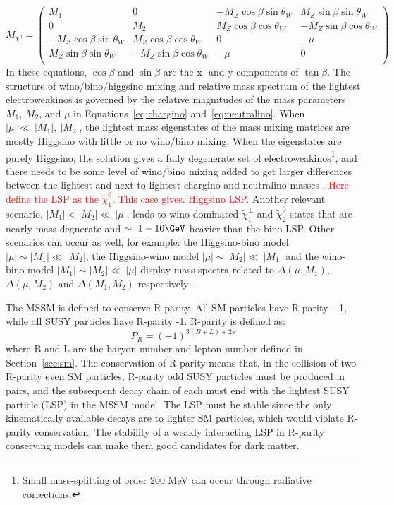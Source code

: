 \begin{equation}
M_{\chi^0}=
\begin{pmatrix}
M_1 & 0 & -M_Z\cos\beta \sin\theta_W & M_Z\sin\beta \sin\theta_W\\
0 & M_2 & M_Z\cos\beta \cos\theta_W & -M_Z\sin\beta \cos\theta_W\\
-M_Z\cos\beta \sin\theta_W & M_Z\cos\beta \cos\theta_W & 0 & -\mu \\
M_Z\sin\beta \sin\theta_W & -M_Z\sin\beta \cos\theta_W & -\mu & 0 \\
\end{pmatrix}
\label{eq:neutralino}
\end{equation}
In these equations, $\cos\beta$ and $\sin\beta$ are the x- and y-components of $\tan\beta$.  The structure of wino/bino/higgsino mixing and relative mass spectrum of the lightest electroweakinos is governed by the relative magnitudes of the mass parameters $M_1$, $M_2$, and $\mu$ in Equations~\ref{eq:chargino} and~\ref{eq:neutralino}.  When $|\mu|\ll~|M_1|,~|M_2|$, the lightest mass eigenstates of the mass mixing matrices are mostly Higgsino with little or no wino/bino mixing.  When the eigenstates are purely Higgsino, the solution gives a fully degenerate set of electroweakinos\footnote{Small mass-splitting of order 200 MeV can occur through radiative corrections.}, and there needs to be some level of wino/bino mixing added to get larger differences between the lightest and next-to-lightest chargino and neutralino masses \cite{PhysRevD.93.063525}.  \textcolor{red}{Here define the LSP as the $\tilde\chi_1^0$.  This case gives. Higgsino LSP.}  Another relevant scenario, $|M_1| <|M_2|\ll~|\mu|$, leads to wino dominated $\tilde\chi_1^\pm$ and $\tilde\chi_2^0$ states that are nearly mass degnerate and $\sim~1-10\GeV$ heavier than the bino LSP. Other scenarios can occur as well, for example: the Higgsino-bino model $|\mu|\sim |M_1|\ll~|M_2|$, the Higgsino-wino model $|\mu|\sim |M_2|\ll~|M_1|$ and the wino-bino model $|M_1|\sim |M_2|\ll~|\mu|$ display mass spectra related to $\Delta(\mu, M_1)$, $\Delta(\mu, M_2)$ and $\Delta(M_1, M_2)$ respectively~\cite{PhysRevD.96.055018}.  
  
The MSSM is defined to conserve R-parity.  All SM particles have R-parity +1, while all SUSY particles have R-parity -1.  R-parity is defined as:
\begin{equation}
 P_R=(-1)^{3(B+L)+2s}
 \end{equation}
 where B and L are the baryon number and lepton number defined in Section~\ref{sec:sm}.  The conservation of R-parity means that, in the collision of two R-parity even SM particles, R-parity odd SUSY particles must be produced in pairs, and the subsequent decay chain of each must end with the lightest SUSY particle (LSP) in the MSSM model.  The LSP must be stable since the only kinematically available decays are to lighter SM particles, which would violate R-parity conservation.  The stability of a weakly interacting LSP in R-parity conserving models can make them good candidates for dark matter.  

